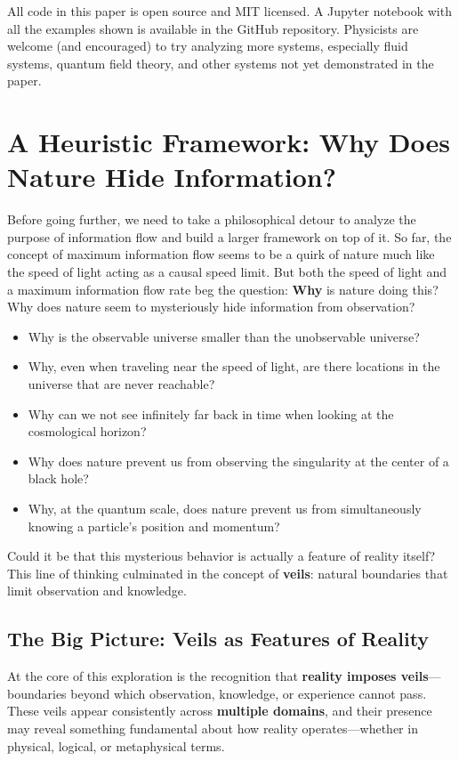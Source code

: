 \documentclass[12pt]{article}
\begin{document}
All code in this paper is open source and MIT licensed. A Jupyter notebook with all the examples shown is available in the GitHub repository. Physicists are welcome (and encouraged) to try analyzing more systems, especially fluid systems, quantum field theory, and other systems not yet demonstrated in the paper.


\section{A Heuristic Framework: Why Does Nature Hide Information?}

Before going further, we need to take a philosophical detour to analyze the purpose of information flow and build a larger framework on top of it. So far, the concept of maximum information flow seems to be a quirk of nature much like the speed of light acting as a causal speed limit. But both the speed of light and a maximum information flow rate beg the question: \textbf{Why} is nature doing this? Why does nature seem to mysteriously hide information from observation?
\begin{itemize}
    \item Why is the observable universe smaller than the unobservable universe?
    \item Why, even when traveling near the speed of light, are there locations in the universe that are never reachable?
    \item Why can we not see infinitely far back in time when looking at the cosmological horizon?
    \item Why does nature prevent us from observing the singularity at the center of a black hole?
    \item Why, at the quantum scale, does nature prevent us from simultaneously knowing a particle's position and momentum?
\end{itemize}

Could it be that this mysterious behavior is actually a feature of reality itself? This line of thinking culminated in the concept of \textbf{veils}: natural boundaries that limit observation and knowledge.

\subsection{The Big Picture: Veils as Features of Reality}

At the core of this exploration is the recognition that \textbf{reality imposes veils}—boundaries beyond which observation, knowledge, or experience cannot pass. These veils appear consistently across \textbf{multiple domains}, and their presence may reveal something fundamental about how reality operates—whether in physical, logical, or metaphysical terms.
\end{document}
